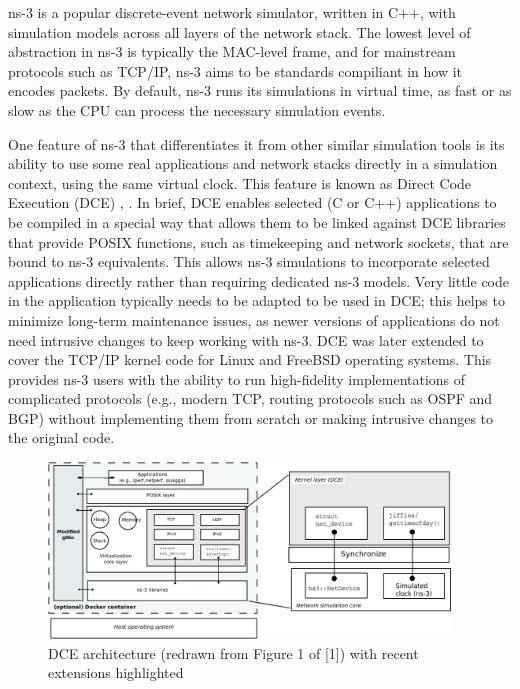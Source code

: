 \documentclass{sig-alternate}
\begin{document}
ns-3 is a popular discrete-event network simulator, written in C++, with
simulation models across all layers of the network stack.  The lowest level
of abstraction in ns-3 is typically the MAC-level frame, and for mainstream
protocols such as TCP/IP, ns-3 aims to be standards compiliant in how it
encodes packets.  By default, ns-3 runs its simulations in virtual time,
as fast or as slow as the CPU can process the necessary simulation events.

One feature of ns-3 that differentiates it from other similar simulation tools
is its ability to use some real applications and network stacks directly
in a simulation context, using the same virtual clock.  This feature is
known as Direct Code Execution (DCE) \cite{Tazaki13}, \cite{Lacage10}.  In
brief, DCE enables selected (C or C++) applications to be compiled in 
a special way that allows them to be linked against DCE libraries that
provide POSIX functions, such as timekeeping and network sockets, that
are bound to ns-3 equivalents.  This allows ns-3 simulations to incorporate
selected applications directly rather than requiring dedicated ns-3 models.
Very little code in the application typically needs to be adapted to
be used in DCE; this helps to minimize long-term maintenance issues, as
newer versions of applications do not need intrusive changes to keep
working with ns-3.  DCE was later extended to cover the TCP/IP kernel
code for Linux and FreeBSD operating systems.  This provides ns-3 users 
with the ability to run high-fidelity implementations of complicated
protocols (e.g., modern TCP, routing protocols such as OSPF and BGP)
without implementing them from scratch or making intrusive changes to
the original code. 

\begin{figure}[h!]
  \centering
    \includegraphics[width=0.95\textwidth]{figs/architecture.png}

  \caption{DCE architecture (redrawn from Figure 1 of [1]) with recent extensions highlighted}
  \label{fig:architecture}
\end{figure}
\end{document}
